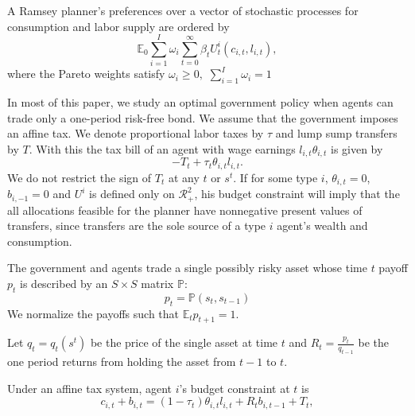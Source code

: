 \documentclass[11.5pt,twoside]{article}
\begin{document}

A Ramsey  planner's preferences over a vector of stochastic processes for consumption and
labor supply  are ordered by
\begin{equation}
\mathbb{E}_{0}\sum_{i=1}^{I}\omega_{i}\sum_{t=0}^{\infty }\beta_t U_{t}^{i}\left( c_{i,t},l_{i,t}\right),  \label{govmt objective}
\end{equation}
where the Pareto weights satisfy $\omega _{i}\geq 0,$ $\sum_{i=1}^{I}\omega _{i}=1$

In most of this paper, we study an optimal  government policy when agents can   trade
only a one-period risk-free bond.  We assume that the government  imposes an
affine tax. We denote proportional labor taxes by $\tau$ and lump sump transfers by $T$. With this the tax bill of an agent with wage earnings $l_{i,t}\theta_{i,t}$ is given by
\begin{equation*}
- T_t + \tau_t \theta_{i,t}l_{i,t}. \end{equation*}
We do not restrict the sign of $T_{t}$ at any $t$ or $s^t$. %
If for some type $i$, $\theta _{i,t}=0$, $b_{i, -1} = 0$ and $U^i$ is defined only on $\mathcal{R}^2_{+}$, his budget constraint will imply that the all allocations feasible for the planner have nonnegative present values of
transfers, since transfers are the sole source of a type $i$ agent's wealth and consumption.


The government and agents trade a single  possibly risky  asset whose  time $t$ payoff $p_t$ is described by an $S \times S$ matrix $\mathbb{P}$:
\[p_t=\mathbb{P}(s_{t},s_{t-1}) \]
We normalize the payoffs such that $\mathbb{E}_tp_{t+1}=1$. 

Let $q_t= q_t(s^t)$ be the price of the single  asset at time $t$ and $R_{t}=\frac{p_t}{q_{t-1}}$  be the one period returns from holding the asset from $t-1$ to $t$.


Under an affine tax system, agent $i$'s budget constraint at $t$ is%
\begin{equation}
c_{i,t}+b_{i,t}=\left( 1-\tau _{t}\right) \theta
_{i,t}l_{i,t}+R_{t}b_{i,t-1}+T_{t},  \label{agent bc affine}
\end{equation}
\end{document}
